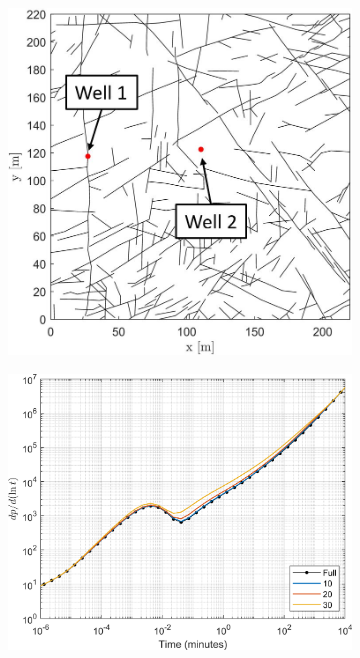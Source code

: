 \documentclass[Supplementary.tex]{subfiles}
\begin{document}
 \begin{figure}[ht]
     \centering
     \begin{subfigure}{0.28\textwidth}
        \includegraphics[width=\textwidth]{Apodi_DD/Apodi2.JPG}
        \label{fig:Apodi2}
     \end{subfigure}
     \begin{subfigure}{0.35\textwidth}
        \includegraphics[width=\textwidth]{Apodi_DD/Apodi2_frac_nohead.png}

\end{subfigure}
\end{figure}
\end{document}
